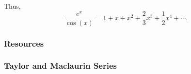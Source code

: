 Thus,
\[
\frac{e^x}{\cos(x)}
= 1 + x + x^2 + \frac{2}{3}x^3 + \frac{1}{2}x^4 + \cdots.
\]


\subsubsection{Resources}
\label{sss:reso-55b5}


\subsubsection{Taylor and Maclaurin Series}
\label{sss:tayl-313c}


